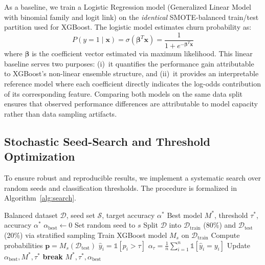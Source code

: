 \documentclass[10pt, conference, letterpaper]{IEEEtran}
\begin{document}
As a baseline, we train a Logistic Regression model (Generalized Linear Model with binomial family and logit link) on the \textit{identical} SMOTE-balanced train/test partition used for XGBoost. The logistic model estimates churn probability as:
\begin{equation}
P(y{=}1 \mid \mathbf{x}) = \sigma(\boldsymbol{\beta}^T \mathbf{x}) = \frac{1}{1 + e^{-\boldsymbol{\beta}^T \mathbf{x}}}
\label{eq:logistic}
\end{equation}
where $\boldsymbol{\beta}$ is the coefficient vector estimated via maximum likelihood. This linear baseline serves two purposes: (i)~it quantifies the performance gain attributable to XGBoost's non-linear ensemble structure, and (ii)~it provides an interpretable reference model where each coefficient directly indicates the log-odds contribution of its corresponding feature. Comparing both models on the same data split ensures that observed performance differences are attributable to model capacity rather than data sampling artifacts.

\subsection{Stochastic Seed-Search and Threshold Optimization}
\label{subsec:search}

To ensure robust and reproducible results, we implement a systematic search over random seeds and classification thresholds. The procedure is formalized in Algorithm~\ref{alg:search}.

\begin{algorithm}[htbp]
\caption{Stochastic Seed-Search with Threshold Optimization}
\label{alg:search}
\begin{algorithmic}[1]
\REQUIRE Balanced dataset $\mathcal{D}$, seed set $\mathcal{S}$, target accuracy $\alpha^*$
\ENSURE Best model $M^*$, threshold $\tau^*$, accuracy $\alpha^*$
\STATE $\alpha_{\text{best}} \leftarrow 0$
    \STATE Set random seed to $s$
    \STATE Split $\mathcal{D}$ into $\mathcal{D}_{\text{train}}$ (80\%) and $\mathcal{D}_{\text{test}}$ (20\%) via stratified sampling
    \STATE Train XGBoost model $M_s$ on $\mathcal{D}_{\text{train}}$
    \STATE Compute probabilities $\mathbf{p} = M_s(\mathcal{D}_{\text{test}})$
        \STATE $\hat{y}_i = \mathbb{1}[p_i > \tau]$
        \STATE $\alpha_\tau = \frac{1}{n}\sum_{i=1}^{n} \mathbb{1}[\hat{y}_i = y_i]$
            \STATE Update $\alpha_{\text{best}}, M^*, \tau^*$
        \ENDIF
    \ENDFOR
        \STATE \textbf{break}
    \ENDIF
\ENDFOR
\RETURN $M^*, \tau^*, \alpha_{\text{best}}$
\end{algorithmic}
\end{algorithm}
\end{document}
